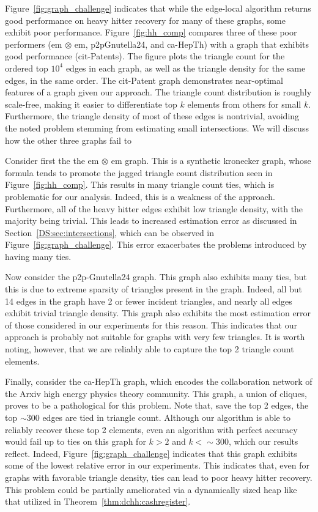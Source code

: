 \documentclass[10]{report}
\begin{document}
Figure~\ref{fig:graph_challenge} indicates that while the edge-local algorithm returns good performance on heavy hitter recovery for many of these graphs, some exhibit poor performance.
Figure~\ref{fig:hh_comp} compares three of these poor performers (em $\otimes$ em, p2pGnutella24, and ca-HepTh) with a graph that exhibits good performance (cit-Patents).
The figure plots the triangle count for the ordered top $10^4$ edges in each graph, as well as the triangle density for the same edges, in the same order.
The cit-Patent graph demonstrates near-optimal features of a graph given our approach.
The triangle count distribution is roughly scale-free, making it easier to differentiate top $k$ elements from others for small $k$. 
Furthermore, the triangle density of most of these edges is nontrivial, avoiding the noted problem stemming from estimating small intersections. 
We will discuss how the other three graphs fail to 

Consider first the the em $\otimes$ em graph. 
This is a synthetic kronecker graph, whose formula tends to promote the jagged triangle count distribution seen in Figure~\ref{fig:hh_comp}.
This results in many triangle count ties, which is problematic for our analysis. 
Indeed, this is a weakness of the approach.
Furthermore, all of the heavy hitter edges exhibit low triangle density, with the majority being trivial. 
This leads to increased estimation error as discussed in Section~\ref{DS:sec:intersections}, which can be observed in Figure~\ref{fig:graph_challenge}.
This error exacerbates the problems introduced by having many ties.

Now consider the p2p-Gnutella24 graph. 
This graph also exhibits many ties, but this is due to extreme sparsity of triangles present in the graph. 
Indeed, all but 14 edges in the graph have 2 or fewer incident triangles, and nearly all edges exhibit trivial triangle density.
This graph also exhibits the most estimation error of those considered in our experiments for this reason.
This indicates that our approach is probably not suitable for graphs with very few triangles.
It is worth noting, however, that we are reliably able to capture the top 2 triangle count elements. 

Finally, consider the ca-HepTh graph, which encodes the collaboration network of the Arxiv high energy physics theory community.
This graph, a union of cliques, proves to be a pathological for this problem. 
Note that, save the top 2 edges, the top $\sim 300$ edges are tied in triangle count.
Although our algorithm is able to reliably recover these top 2 elements, even an algorithm with perfect accuracy would fail up to ties on this graph for $k >2$ and $k < \sim 300$, which our results reflect.
Indeed, Figure~\ref{fig:graph_challenge} indicates that this graph exhibits some of the lowest relative error in our experiments.
This indicates that, even for graphs with favorable triangle density, ties can lead to poor heavy hitter recovery. 
This problem could be partially ameliorated via a dynamically sized heap like that utilized in Theorem~\ref{thm:dchh:cashregister}.
\end{document}
